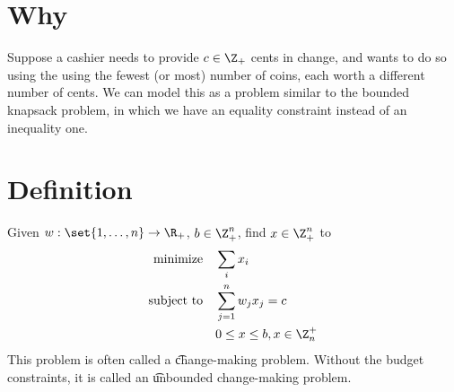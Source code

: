 
\section*{Why}

Suppose a cashier needs to provide $c \in \Z _+$ cents in change, and wants to do so using the using the fewest (or most) number of coins, each worth a different number of cents.
We can model this as a problem similar to the bounded knapsack problem, in which we have an equality constraint instead of an inequality one.

\section*{Definition}

Given $w: \set{1, \dots , n} \to \R _+$, $b \in \Z _+^n$, find $x \in \Z _+^n$ to
\[
\begin{aligned}
\text{minimize} & \quad \sum_i x_i \\
\text{subject to} & \quad \sum_{j = 1}^n w_j x_j = c \\
& \quad 0 \leq x \leq b, x \in \Z _{n}^{+}
\end{aligned}
\]
This problem is often called a \t{change-making problem}.
Without the budget constraints, it is called an \t{unbounded change-making problem}.

\blankpage